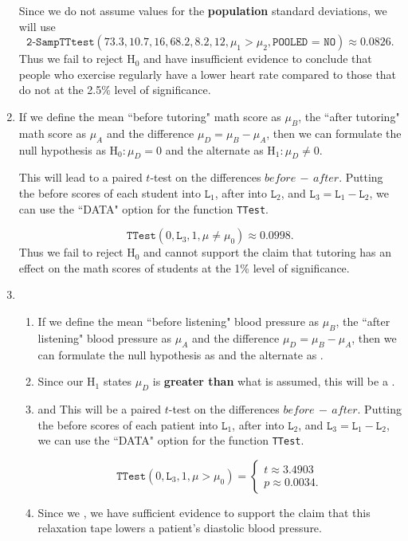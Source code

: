 \documentclass{article}
\begin{document}
\begin{enumerate}
Since we do not assume values for the \textbf{population} standard deviations, we will use $$\texttt{2-SampTTtest}(73.3, 10.7, 16, 68.2, 8.2, 12, \mu_1 > \mu_2, \texttt{POOLED = NO}) \approx 0.0826.$$
Thus we fail to reject $\text{H}_0$ and have insufficient evidence to conclude that people who exercise regularly have a lower heart rate compared to those that do not at the 2.5\% level of significance.

\item {} If we define the mean ``before tutoring" math score as $\mu_B$, the ``after tutoring" math score as $\mu_A$ and the difference $\mu_D = \mu_B - \mu_A$, then we can formulate the null hypothesis as $\text{H}_0: \mu_D = 0$ and the alternate as $\text{H}_1: \mu_D \neq 0$.

This will lead to a paired $t$-test on the differences $before\, - \, after$. Putting the before scores of each student into $\texttt{L}_1$, after into $\texttt{L}_2$, and $\texttt{L}_3 = \texttt{L}_1 - \texttt{L}_2$, we can use the ``DATA" option for the function \texttt{TTest}.

$$\texttt{TTest}(0, \texttt{L}_3, 1, \mu \neq \mu_0) \approx 0.0998.$$
Thus we fail to reject $\text{H}_0$ and cannot support the claim that tutoring has an effect on the math scores of students at the 1\% level of significance.

\item \begin{enumerate}
\item If we define the mean ``before listening" blood pressure as $\mu_B$, the ``after listening" blood pressure as $\mu_A$ and the difference $\mu_D = \mu_B - \mu_A$, then we can formulate the null hypothesis as  and the alternate as .

\item Since our $\text{H}_1$ states $\mu_D$ is \textbf{greater than} what is assumed, this will be a .

\item {} and  This will be a paired $t$-test on the differences $before\, - \, after$. Putting the before scores of each patient into $\texttt{L}_1$, after into $\texttt{L}_2$, and $\texttt{L}_3 = \texttt{L}_1 - \texttt{L}_2$, we can use the ``DATA" option for the function \texttt{TTest}.

$$\texttt{TTest}(0, \texttt{L}_3, 1, \mu >\mu_0) = \begin{cases} t \approx 3.4903 \\p \approx 0.0034. \end{cases}$$

\item Since we , we have sufficient evidence to support the claim that this relaxation tape lowers a patient's diastolic blood pressure.
\end{enumerate}

\end{enumerate}
\end{document}
